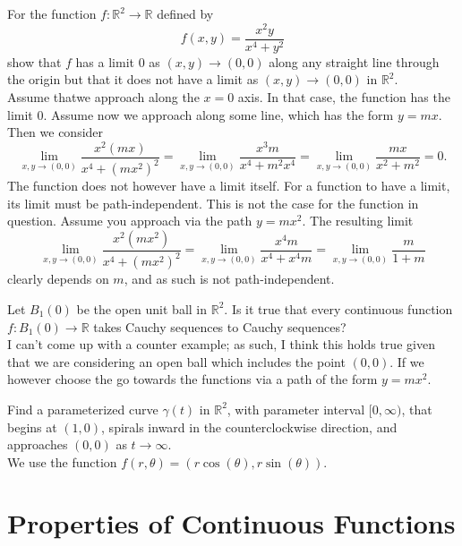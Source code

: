 \documentclass[12pt]{book}
\newcommand{\R}{\mathbb{R}}
\newenvironment{exercise}[2][Exercise]{\begin{trivlist}
\item[\hskip \labelsep {\bfseries #1}\hskip \labelsep {\bfseries #2.}]}{\end{trivlist}}
\begin{document}
\begin{exercise}{8.1.5}
For the function  $f : \R^2 \to \R$ defined by 
    \[ f(x,y) = \frac{x^2 y}{x^4 + y^2} \]
show that $f$ has a limit $0$ as $(x,y) \to (0,0)$ along any straight line through the origin but that it does not have a limit as $(x,y)\to (0,0)$ in $\R^2$. \\

Assume thatwe approach along the $x = 0$ axis. In that case, the function has the limit $0$. Assume now we approach along some line, which has the form $ y = m x$. Then we consider 
    \[ \lim_{x,y \to (0,0)} \frac{x^2  (mx)}{x^4 + (m x^2)^2} = \lim_{x,y \to (0,0)} \frac{x^3 m}{x^4 + m^2 x^4} = \lim_{x,y \to (0,0)} \frac{m x}{x^2 + m^2} = 0.\]
    The function does not however have a limit itself. For a function to have a limit, its limit must be path-independent. This is not the case for the function in question. Assume you approach via the path $y = m x^2$. The resulting limit
        \[ \lim_{x,y \to (0,0)} \frac{x^2 (mx^2)}{x^4 + (mx^2)^2} = \lim_{x,y \to (0,0)} \frac{x^4 m}{x^4 + x^4 m} = \lim_{x,y \to (0,0)} \frac{m}{1 + m}  \]
    clearly depends on $m$, and as such is not path-independent.
\end{exercise}



\begin{exercise}{8.1.12}
Let $B_1(0)$ be the open unit ball in $\R^2$. Is it true that every continuous function $f:B_1(0) \to \R$ takes Cauchy sequences to Cauchy sequences? \\

I can't come up with a counter example; as such, I think this holds true given that we are considering an open ball which includes the point $(0,0)$. If we however choose the go towards the functions via a path of the form $y = m x^2$.
\end{exercise}


\begin{exercise}{8.1.14}
Find a parameterized curve $\gamma(t)$ in $\R^2$, with parameter interval $[0, \infty)$, that begins at $(1,0)$, spirals inward in the counterclockwise direction, and approaches $(0,0)$ as $t \to \infty$. \\

We use the function $f(r,\theta) = \left( r \cos(\theta), r \sin(\theta) \right)$.
\end{exercise}




\section{Properties of Continuous Functions}
\end{document}
